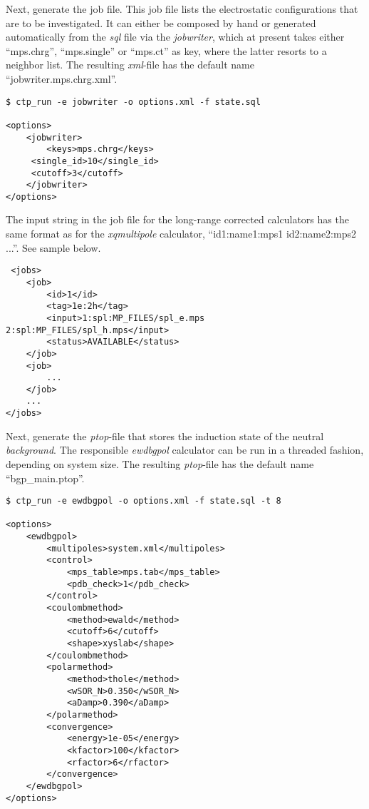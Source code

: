 Next, generate the job file. This job file lists the electrostatic configurations that are to be investigated. It can either be composed by hand or generated automatically from the {\em sql} file via the {\em jobwriter}, which at present takes either ``mps.chrg'', ``mps.single'' or ``mps.ct'' as key, where the latter resorts to a neighbor list. The resulting {\em xml}-file has the default name ``jobwriter.mps.chrg.xml''.
\begin{verbatim}
$ ctp_run -e jobwriter -o options.xml -f state.sql

<options>
    <jobwriter>
        <keys>mps.chrg</keys>
	 <single_id>10</single_id>
	 <cutoff>3</cutoff>
    </jobwriter>
</options> 
\end{verbatim}

The input string in the job file for the long-range corrected calculators has the same format as for the {\em xqmultipole} calculator, ``id1:name1:mps1 id2:name2:mps2 ...''. See sample below.
\begin{verbatim}
 <jobs>
    <job>
        <id>1</id>
        <tag>1e:2h</tag>
        <input>1:spl:MP_FILES/spl_e.mps 2:spl:MP_FILES/spl_h.mps</input>
        <status>AVAILABLE</status>
    </job>
    <job>
        ...
    </job>
    ...
</jobs>
\end{verbatim}

Next, generate the {\em ptop}-file that stores the induction state of the neutral {\em background}. The responsible {\em ewdbgpol} calculator can be run in a threaded fashion, depending on system size. The resulting {\em ptop}-file has the default name ``bgp\_main.ptop''. 
\begin{verbatim}
$ ctp_run -e ewdbgpol -o options.xml -f state.sql -t 8

<options>
    <ewdbgpol>
        <multipoles>system.xml</multipoles>
        <control>
            <mps_table>mps.tab</mps_table>
            <pdb_check>1</pdb_check>
        </control>
        <coulombmethod>
            <method>ewald</method>
            <cutoff>6</cutoff>
            <shape>xyslab</shape>
        </coulombmethod>
        <polarmethod>
            <method>thole</method>
            <wSOR_N>0.350</wSOR_N>
            <aDamp>0.390</aDamp>
        </polarmethod>
        <convergence>
            <energy>1e-05</energy>
            <kfactor>100</kfactor>
            <rfactor>6</rfactor>
        </convergence>
    </ewdbgpol>
</options>
\end{verbatim}

